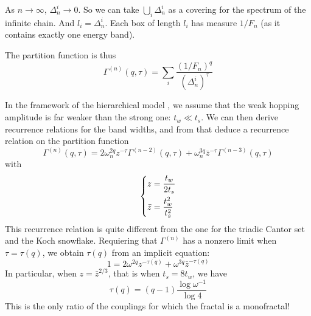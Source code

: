 \documentclass[11pt]{article}
\begin{document}
As $n \rightarrow \infty$, $\Delta^i_n \rightarrow 0$. So we can take $\bigcup_i \Delta^i_n$ as a covering for the spectrum of the infinite chain. And $l_i = \Delta^i_n$.
Each box of length $l_i$ has measure $1/F_n$ (as it contains exactly one energy band).

The partition function is thus
\begin{equation}
	\Gamma^{(n)}(q,\tau) = \sum_i \frac{(1/F_n)^q}{\left(\Delta^i_n\right)^\tau}
\end{equation}

In the framework of the hierarchical model \cite{Piechon95}, we assume that the weak hopping amplitude is far weaker than the strong one: $t_w \ll t_s$.
We can then derive recurrence relations for the band widths, and from that deduce a recurrence relation on the partition function
\begin{equation}
	\Gamma^{(n)}(q,\tau) = 2 \omega_n^{2q}z^{-\tau}\Gamma^{(n-2)}(q,\tau) + \omega_n^{3q}\bar{z}^{-\tau}\Gamma^{(n-3)}(q,\tau)
\end{equation}
with
\begin{equation}
	\begin{dcases*}
        z = \frac{t_w}{2 t_s}\\
       \bar{z} = \frac{t_w^2}{t_s^2}
     \end{dcases*}
\end{equation}
This recurrence relation is quite different from the one for the triadic Cantor set and the Koch snowflake. 
Requiering that $\Gamma^{(n)}$ has a nonzero limit when $\tau = \tau(q)$, we obtain $\tau(q)$ from an implicit equation:
\begin{equation}
	1 = 2 \omega^{2q} z^{-\tau(q)} + \omega^{3q} \bar{z}^{-\tau(q)}
\end{equation}
In particular, when $z = \bar{z}^{2/3}$, that is when $t_s = 8 t_w$, we have
\begin{equation}
	\tau(q) = (q-1)\frac{\log \omega^{-1}}{\log 4}
\end{equation}
This is the only ratio of the couplings for which the fractal is a monofractal!
{}

\end{document}
